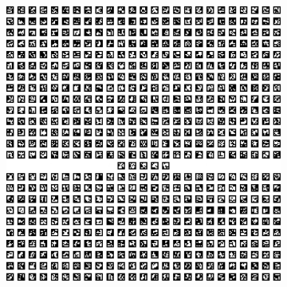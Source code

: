 \documentclass[../Head/report.tex]{subfiles}
\begin{document}
\begin{figure}[H]
\begin{subfigure}[t]{.30\textwidth}
        \caption{}
        \label{fig:vision_navigation_vision_navigation_two}
    \end{subfigure}
    \caption{}
    \label{fig:vision_navigation}
\end{figure}

\begin{figure}[H]
    \centering
    \begin{subfigure}[t]{.20\textwidth}
        \centering
        \includegraphics[width=\textwidth]{../Figures/vision_navigation/grid_board_new_200_full.png}
        \caption{}
        \label{fig:vision_navigation_full_pattern_board}
    \end{subfigure}
     \hspace{0.2em}
    \begin{subfigure}[t]{.20\textwidth}
        \centering

\end{subfigure}
\end{figure}
\end{document}
